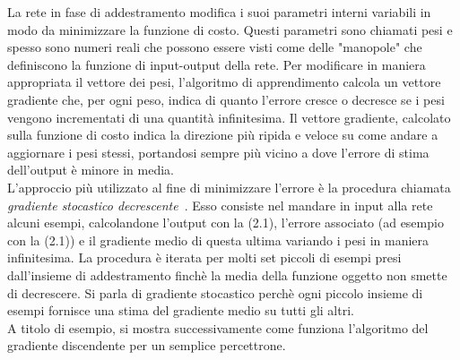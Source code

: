 La rete in fase di addestramento modifica i suoi parametri interni variabili in modo da
 minimizzare la funzione di costo. Questi parametri sono chiamati pesi e spesso sono numeri 
 reali che possono essere visti come delle "manopole" che definiscono la funzione di input-output
  della rete.
Per modificare in maniera appropriata il vettore dei pesi, l’algoritmo di apprendimento calcola 
un vettore gradiente che, per ogni peso, indica di quanto l’errore cresce o decresce se 
i pesi vengono incrementati di una quantità infinitesima. Il vettore gradiente,
 calcolato sulla funzione di costo indica la direzione più ripida e 
 veloce su come andare a aggiornare i pesi stessi, portandosi sempre più vicino a dove
l’errore di stima dell'output è minore in media.\\
L’approccio più utilizzato al fine di minimizzare l’errore è la procedura chiamata \emph{gradiente stocastico 
decrescente}~\cite{ann}. Esso consiste nel mandare in input alla rete alcuni esempi,
calcolandone l’output con la (2.1), l’errore associato (ad esempio con la (2.1)) e il gradiente medio
di questa ultima variando i pesi in maniera infinitesima. La procedura è
iterata per molti set piccoli di esempi presi dall’insieme di addestramento finchè la media
della funzione oggetto non smette di decrescere. Si parla di gradiente stocastico perchè ogni piccolo
 insieme di esempi fornisce una stima del gradiente medio su tutti gli altri.\\
A titolo di esempio, si mostra successivamente come funziona l’algoritmo del gradiente discendente 
per un semplice percettrone. 
